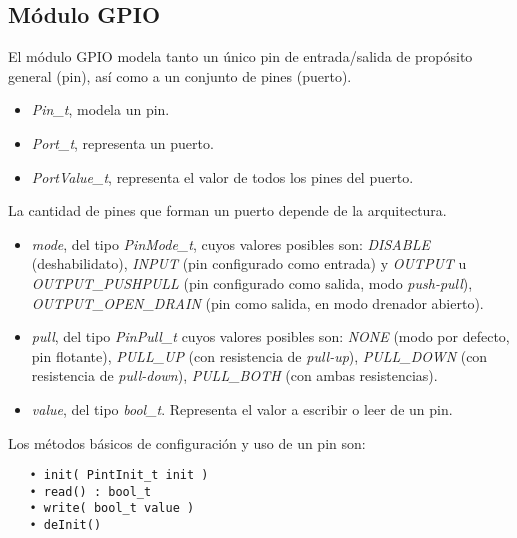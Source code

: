 \subsection{Módulo GPIO}

El módulo GPIO modela tanto un único pin de entrada/salida de propósito general (pin), así como a un conjunto de pines (puerto). 

\pagebreak 
{}

\begin{itemize}
\item
\emph{Pin\_t}, modela un pin.
\item
\emph{Port\_t}, representa un puerto.
\item
\emph{PortValue\_t}, representa el valor de todos los pines del puerto.
\end{itemize}

La cantidad de pines que forman un puerto depende de la arquitectura.


\begin{itemize}
\item
\emph{mode}, del tipo \emph{PinMode\_t}, cuyos valores posibles son: \emph{DISABLE} (deshabilidato), \emph{INPUT} (pin configurado como entrada) y \emph{OUTPUT} u \emph{OUTPUT\_PUSHPULL} (pin configurado como salida, modo \emph{push-pull}), \emph{OUTPUT\_OPEN\_DRAIN} (pin como salida, en modo drenador abierto).
\item
\emph{pull}, del tipo \emph{PinPull\_t} cuyos valores posibles son: \emph{NONE} (modo por defecto, pin flotante), \emph{PULL\_UP} (con resistencia de \emph{pull-up}), \emph{PULL\_DOWN} (con resistencia de \emph{pull-down}), \emph{PULL\_BOTH} (con ambas resistencias).
\item
\emph{value}, del tipo \emph{bool\_t}. Representa el valor a escribir o leer de un pin.
\end{itemize}


Los métodos básicos de configuración y uso de un pin son:

\begin{verbatim}
   • init( PintInit_t init )
   • read() : bool_t
   • write( bool_t value )
   • deInit()
\end{verbatim}


